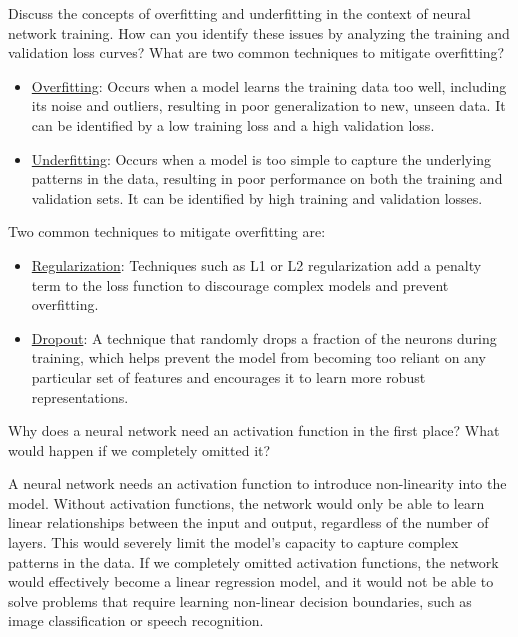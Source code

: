 \begin{ejercicio}
    Discuss the concepts of overfitting and underfitting in the context of neural network training. How can you identify these issues by analyzing the training and validation loss curves? What are two common techniques to mitigate overfitting?
    \begin{itemize}
        \item \ul{Overfitting}: Occurs when a model learns the training data too well, including its noise and outliers, resulting in poor generalization to new, unseen data. It can be identified by a low training loss and a high validation loss.
        \item \ul{Underfitting}: Occurs when a model is too simple to capture the underlying patterns in the data, resulting in poor performance on both the training and validation sets. It can be identified by high training and validation losses.
    \end{itemize}
    Two common techniques to mitigate overfitting are:
    \begin{itemize}
        \item \ul{Regularization}: Techniques such as L1 or L2 regularization add a penalty term to the loss function to discourage complex models and prevent overfitting.
        \item \ul{Dropout}: A technique that randomly drops a fraction of the neurons during training, which helps prevent the model from becoming too reliant on any particular set of features and encourages it to learn more robust representations.
    \end{itemize}
\end{ejercicio}

\begin{ejercicio}
    Why does a neural network need an activation function in the first place? What would happen if we completely omitted it?

    A neural network needs an activation function to introduce non-linearity into the model. Without activation functions, the network would only be able to learn linear relationships between the input and output, regardless of the number of layers. This would severely limit the model's capacity to capture complex patterns in the data. If we completely omitted activation functions, the network would effectively become a linear regression model, and it would not be able to solve problems that require learning non-linear decision boundaries, such as image classification or speech recognition.
\end{ejercicio}

